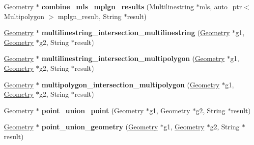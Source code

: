 \begin{DoxyCompactItemize}
\item 
\mbox{\label{classBG__setop__wrapper_ac8719b125a1ea982af122d4cf72e0770}} 
\mbox{\hyperlink{classGeometry}{Geometry}} $\ast$ {\bfseries combine\+\_\+mls\+\_\+mplgn\+\_\+results} (Multilinestring $\ast$mls, auto\+\_\+ptr$<$ Multipolygon $>$ mplgn\+\_\+result, String $\ast$result)
\item 
\mbox{\label{classBG__setop__wrapper_ac50a42519952657e4c9b2f083b3996c4}} 
\mbox{\hyperlink{classGeometry}{Geometry}} $\ast$ {\bfseries multilinestring\+\_\+intersection\+\_\+multilinestring} (\mbox{\hyperlink{classGeometry}{Geometry}} $\ast$g1, \mbox{\hyperlink{classGeometry}{Geometry}} $\ast$g2, String $\ast$result)
\item 
\mbox{\label{classBG__setop__wrapper_a29cb29b1e63849f6e528472061f7ef96}} 
\mbox{\hyperlink{classGeometry}{Geometry}} $\ast$ {\bfseries multilinestring\+\_\+intersection\+\_\+multipolygon} (\mbox{\hyperlink{classGeometry}{Geometry}} $\ast$g1, \mbox{\hyperlink{classGeometry}{Geometry}} $\ast$g2, String $\ast$result)
\item 
\mbox{\label{classBG__setop__wrapper_a4eb71a71a4f8ad965f9796df64170cef}} 
\mbox{\hyperlink{classGeometry}{Geometry}} $\ast$ {\bfseries multipolygon\+\_\+intersection\+\_\+multipolygon} (\mbox{\hyperlink{classGeometry}{Geometry}} $\ast$g1, \mbox{\hyperlink{classGeometry}{Geometry}} $\ast$g2, String $\ast$result)
\item 
\mbox{\label{classBG__setop__wrapper_a4a9e781e5fd24d4af0515affc2ef277e}} 
\mbox{\hyperlink{classGeometry}{Geometry}} $\ast$ {\bfseries point\+\_\+union\+\_\+point} (\mbox{\hyperlink{classGeometry}{Geometry}} $\ast$g1, \mbox{\hyperlink{classGeometry}{Geometry}} $\ast$g2, String $\ast$result)
\item 
\mbox{\label{classBG__setop__wrapper_aaeb74c414568067a8e4ea783cb9cd6e4}} 
\mbox{\hyperlink{classGeometry}{Geometry}} $\ast$ {\bfseries point\+\_\+union\+\_\+geometry} (\mbox{\hyperlink{classGeometry}{Geometry}} $\ast$g1, \mbox{\hyperlink{classGeometry}{Geometry}} $\ast$g2, String $\ast$result)
\item 
\mbox{\label{classBG__setop__wrapper_a2c54038cc1895cf44bcedca5ad0836ef}} 

\end{DoxyCompactItemize}
